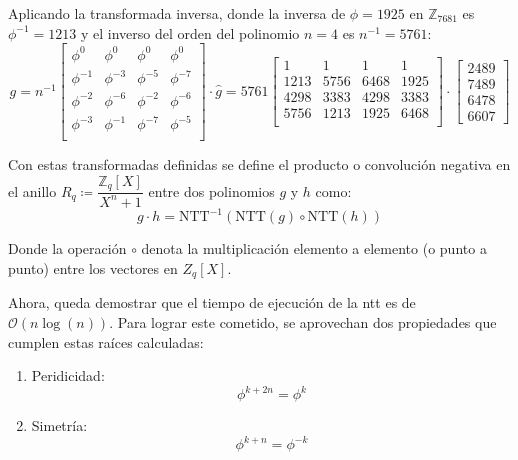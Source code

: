 Aplicando la transformada inversa, donde la inversa de $\phi=1925$ en \(\mathbb{Z}_{7681}\) es $\phi^{-1}=1213$ y el inverso del orden del polinomio \(n=4\) es \(n^{-1}=5761\):
\begin{equation}
	g=n^{-1}\begin{bmatrix}
		\phi^0 & \phi^0 & \phi^0 & \phi^0\\
		\phi^{-1} & \phi^{-3} & \phi^{-5} & \phi^{-7}\\
		\phi^{-2} & \phi^{-6} & \phi^{-2} & \phi^{-6}\\
		\phi^{-3} & \phi^{-1} & \phi^{-7} & \phi^{-5}\\
	\end{bmatrix} \cdot \hat{g}=5761\begin{bmatrix}
	1 & 1 & 1 & 1\\
	1213& 5756& 6468& 1925\\
	4298& 3383& 4298& 3383\\
	5756& 1213& 1925& 6468\\
	\end{bmatrix} \cdot \begin{bmatrix}
	2489\\
	7489\\
	6478\\
	6607 \end{bmatrix}
\end{equation}

Con estas transformadas definidas se define el producto o convolución negativa en el anillo \(	R_q \coloneqq \dfrac{\mathbb{Z}_q[X]}{X^n + 1}\) entre dos polinomios \(g\) y \(h\) como:
\begin{equation}
	g\cdot h= \text{NTT}^{-1}(\text{NTT}(g)\circ\text{NTT}(h))
\end{equation}

Donde la operación \(\circ\) denota la multiplicación elemento a elemento (o punto a punto) entre los vectores en ${Z}_q[X]$.
\newpage

Ahora, queda demostrar que el tiempo de ejecución de la \gls{ntt} es de \(\mathcal{O}(n \log(n))\). Para lograr este cometido, se aprovechan dos propiedades que cumplen estas raíces calculadas:
\begin{enumerate}
	\item Peridicidad: 
	\begin{equation}
		\phi^{k+2n}=\phi^k
	\end{equation}
	\item Simetría:
	\begin{equation}
		\phi^{k+n}=\phi^{-k}
	\end{equation}
\end{enumerate}

